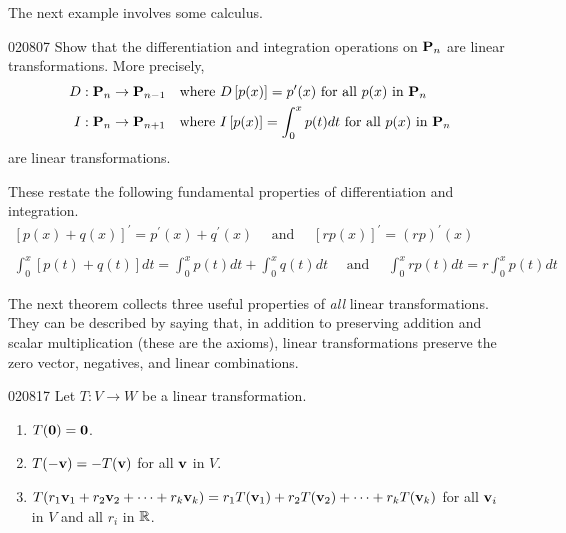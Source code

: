 The next example involves some calculus.


\begin{example}{}{020807}
Show that the differentiation and integration operations on $\textbf{P}_{n}$ are linear transformations. More precisely,
\begin{align*}
D&: \textbf{P}_n \to \textbf{P}_{n-1} \quad \mbox{where } D\left[p(x)\right] = p^\prime(x) \mbox{ for all } p(x) \mbox{ in } \textbf{P}_n \\
I&: \textbf{P}_n \to \textbf{P}_{n+1} \quad \mbox{where } I\left[p(x)\right] = \int_{0}^{x}p(t)dt \mbox{ for all } p(x) \mbox{ in } \textbf{P}_n
\end{align*}
are linear transformations.


\begin{solution}
  These restate the following fundamental properties of differentiation and integration.
\begin{equation*}
\begin{array}{l}
\left[p(x) + q(x)\right]^\prime = p^\prime(x) + q^\prime(x) \quad \mbox{ and } \quad \left[rp(x)\right]^\prime = (rp)^\prime(x) \\
\\
\int_{0}^{x}\left[p(t) + q(t)\right]dt = \int_{0}^{x}p(t)dt + \int_{0}^{x}q(t)dt \quad \mbox{ and } \quad \int_{0}^{x}rp(t)dt = r\int_{0}^{x}p(t)dt
\end{array}
\end{equation*}
\end{solution}
\end{example}

The next theorem collects three useful properties of \textit{all} linear transformations. They can be described by saying that, in addition to preserving addition and scalar multiplication (these are the axioms), linear transformations preserve the zero vector, negatives, and linear combinations.


\begin{theorem}{}{020817}
Let $T : V \to W$ be a linear transformation.


\begin{enumerate}
\item $T(\textbf{0}) = \textbf{0}$.

\item $T(-\textbf{v}) = -T(\textbf{v})$ for all $\textbf{v}$ in $V$.

\item $T(r_{1}\textbf{v}_{1} + r_{2}\textbf{v}_{2} + \cdots  + r_{k}\textbf{v}_{k}) = r_{1}T(\textbf{v}_{1}) + r_{2}T(\textbf{v}_{2}) + \cdots  + r_{k}T(\textbf{v}_{k})$ for all $\textbf{v}_{i}$ in $V$ and all $r_{i}$ in $\mathbb{R}$.

\end{enumerate}
\end{theorem}

